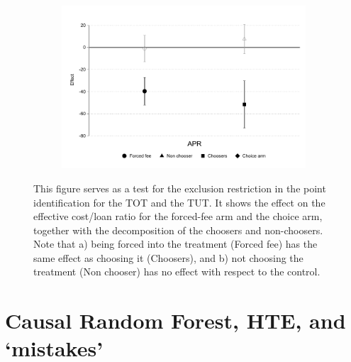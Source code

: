 \begin{figure}[H]
     \caption{Exclusion restriction}
     \label{exclusion_restriction}
    \begin{center}
    \begin{subfigure}{0.6\textwidth}
        \centering
        \includegraphics[width=\textwidth]{Figuras/exclusion_restriction.pdf}
    \end{subfigure}
    \end{center}
    \scriptsize This figure serves as a test for the exclusion restriction in the point identification for the TOT and the TUT. It shows the effect on the effective cost/loan ratio for the forced-fee arm and the choice arm, together with the decomposition of the choosers and non-choosers. Note that a) being forced into the treatment (Forced fee) has the same effect as choosing it (Choosers), and b) not choosing the treatment (Non chooser) has no effect with respect to the control.
    
\end{figure}


\newpage 
\newpage
\section{Causal Random Forest, HTE, and `mistakes'}



